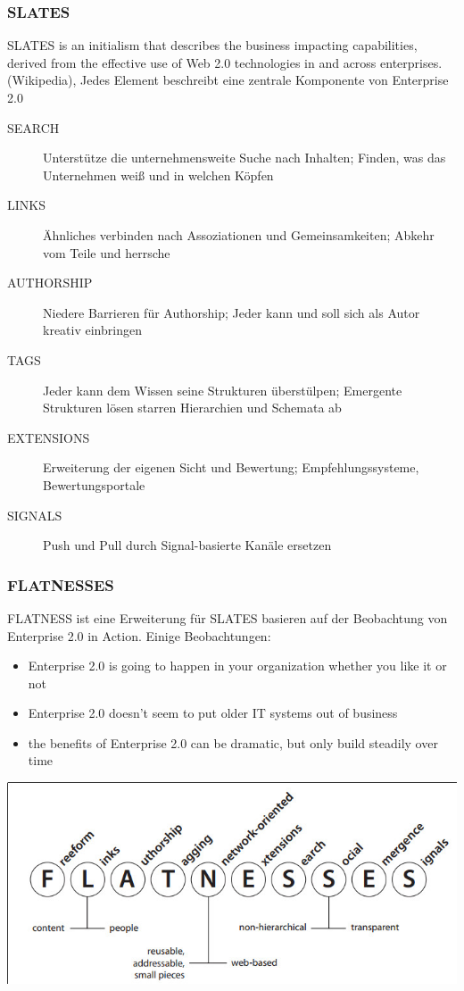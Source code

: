 \documentclass{article} %
\begin{document}
	\subsubsection{SLATES}
	\glqq SLATES is an initialism that describes the business impacting capabilities, derived from the effective use of Web 2.0 technologies in and across enterprises.\grqq (Wikipedia), Jedes Element beschreibt eine zentrale Komponente von Enterprise 2.0
	\begin{description}
		\item[SEARCH] Unterstütze die unternehmensweite Suche nach Inhalten;
		Finden, was das Unternehmen weiß und in welchen Köpfen
		\item[LINKS] Ähnliches verbinden nach Assoziationen und Gemeinsamkeiten;
		Abkehr vom  \glqq Teile und herrsche\glqq 
		\item[AUTHORSHIP] Niedere Barrieren für Authorship;
		Jeder kann und soll sich als Autor kreativ einbringen
		\item[TAGS] Jeder kann dem Wissen seine Strukturen überstülpen;
		Emergente Strukturen lösen starren Hierarchien und Schemata ab
		\item[EXTENSIONS] Erweiterung der eigenen Sicht und Bewertung;
		Empfehlungssysteme, Bewertungsportale
		\item[SIGNALS] Push und Pull durch Signal-basierte Kanäle ersetzen
	\end{description}
	\subsubsection{FLATNESSES}
	FLATNESS ist eine Erweiterung für SLATES basieren auf der Beobachtung von Enterprise 2.0 in Action. Einige Beobachtungen:
	\begin{itemize}
		\item Enterprise 2.0 is going to happen in your organization whether you
		like it or not
		\item Enterprise 2.0 doesn’t seem to put older IT systems out of business
		\item the benefits of Enterprise 2.0 can be dramatic, but only build steadily
		over time
	\end{itemize}
	\begin{center}
		\includegraphics[scale=0.5]{img/FLATNESS.jpg}
	\end{center}
\end{document}
